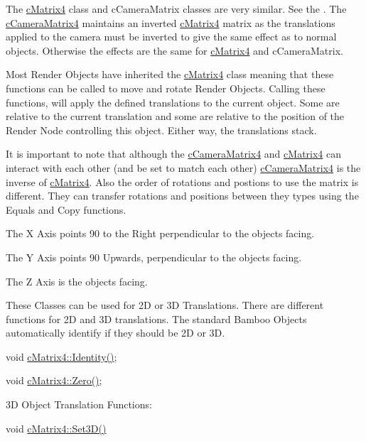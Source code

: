 The \hyperlink{classc_matrix4}{cMatrix4} class and cCameraMatrix classes are very similar. See the . The \hyperlink{classc_camera_matrix4}{cCameraMatrix4} maintains an inverted \hyperlink{classc_matrix4}{cMatrix4} matrix as the translations applied to the camera must be inverted to give the same effect as to normal objects. Otherwise the effects are the same for \hyperlink{classc_matrix4}{cMatrix4} and cCameraMatrix. \par
 Most Render Objects have inherited the \hyperlink{classc_matrix4}{cMatrix4} class meaning that these functions can be called to move and rotate Render Objects. Calling these functions, will apply the defined translations to the current object. Some are relative to the current translation and some are relative to the position of the Render Node controlling this object. Either way, the translations stack. \par
 It is important to note that although the \hyperlink{classc_camera_matrix4}{cCameraMatrix4} and \hyperlink{classc_matrix4}{cMatrix4} can interact with each other (and be set to match each other) \hyperlink{classc_camera_matrix4}{cCameraMatrix4} is the inverse of \hyperlink{classc_matrix4}{cMatrix4}. Also the order of rotations and postions to use the matrix is different. They can transfer rotations and positions between they types using the Equals and Copy functions. \par
 \par
 The X Axis points 90 to the Right perpendicular to the objects facing. \par
 The Y Axis points 90 Upwards, perpendicular to the objects facing. \par
 The Z Axis is the objects facing. \par
 \par
 These Classes can be used for 2D or 3D Translations. There are different functions for 2D and 3D translations. The standard Bamboo Objects automatically identify if they should be 2D or 3D. \par
 \par
 void \hyperlink{classc_matrix4_a6aa4f58a001499cd666f9d65f3a821a0}{cMatrix4::Identity()}; \par
 void \hyperlink{classc_matrix4_acf16f37d849137d2e410ec20f2b4e74d}{cMatrix4::Zero()}; \par
 \par
 3D Object Translation Functions: \par
 void \hyperlink{classc_matrix4_a746ce09337cbf6a3292cbe15991efd79}{cMatrix4::Set3D()} \par
